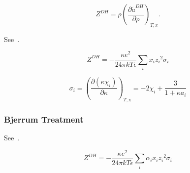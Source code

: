\documentclass[12pt, letterpaper]{article}
\begin{document}
\begin{equation}
    Z^{DH} =\rho\left(\frac{\partial\tilde{a}^{DH}}{\partial\rho}\right)_{T,x}
    .
    \label{eq:z_dh}
\end{equation}

See~\cite{Cameretti2005}.

\begin{equation}
    Z^{DH}=-\frac{\kappa e^2}{24\pi kT\epsilon}\sum_{i}x_{i}z_{i}{}^{2}\sigma_{i}
    \label{eq:z_dh_explicit}
\end{equation}


\begin{equation}
    \sigma_{i}=\left(\frac{\partial(\kappa\chi_{i})}{\partial\kappa}\right)_{T,\mathrm{x}}=-2\chi_{i}+\frac{3}{1+\kappa a_{i}}
    \label{eq:sigma_dh}
\end{equation}

\subsubsection{Bjerrum Treatment}

See~\cite{Bulow2021}.

\begin{equation}
    Z^{DH}=-\frac{\kappa e^2}{24\pi kT\epsilon}\sum_{i}\alpha _{i}x_{i}z_{i}{}^{2}\sigma_{i}
    \label{eq:z_dh_bjerrum}
\end{equation}

\end{document}
